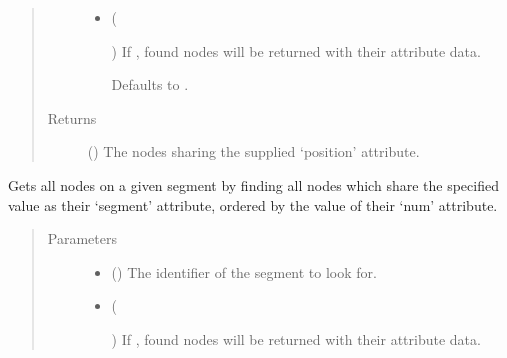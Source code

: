 \documentclass[letterpaper,10pt,english]{sphinxmanual}
\begin{document}
\begin{fulllineitems}
\begin{fulllineitems}
\begin{quote}
\begin{description}
\begin{itemize}
\item {} 
 (%
\begin{footnote}[103]\sphinxAtStartFootnote
{}
%
\end{footnote}\sphinxstyleliteralemphasis{\sphinxupquote{, }}) \textendash{} 
If , found nodes will be returned with their attribute
data.

Defaults to .


\end{itemize}

\item[{Returns}] \leavevmode
{} () \textendash{} The nodes sharing the supplied ‘position’ attribute.

\end{description}\end{quote}

\end{fulllineitems}


\begin{fulllineitems}
\label{\detokenize{cockatoo:cockatoo.KnitNetworkBase.nodes_on_segment}}
Gets all nodes on a given segment by finding all nodes which share the
specified value as their ‘segment’ attribute, ordered by the value of
their ‘num’ attribute.
\begin{quote}\begin{description}
\item[{Parameters}] \leavevmode\begin{itemize}
\item {} 
 () \textendash{} The identifier of the segment to look for.

\item {} 
 (%
\begin{footnote}[104]\sphinxAtStartFootnote
{}
%
\end{footnote}\sphinxstyleliteralemphasis{\sphinxupquote{, }}) \textendash{} 
If , found nodes will be returned with their attribute
data.


\end{itemize}
\end{description}
\end{quote}
\end{fulllineitems}
\end{fulllineitems}
\end{document}
